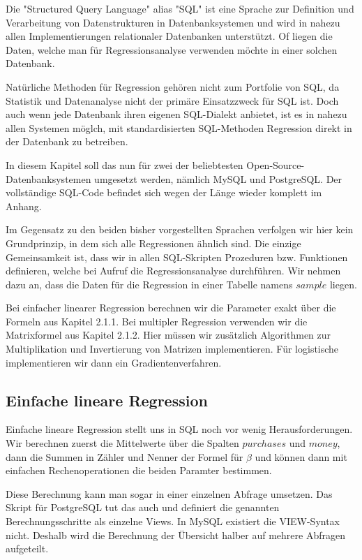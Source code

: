 Die "Structured Query Language" alias "SQL" ist eine Sprache zur Definition und Verarbeitung von Datenstrukturen in Datenbanksystemen und wird in nahezu allen Implementierungen relationaler Datenbanken unterstützt. Of liegen die Daten, welche man für Regressionsanalyse verwenden möchte in einer solchen Datenbank.

Natürliche Methoden für Regression gehören nicht zum Portfolie von SQL, da Statistik und Datenanalyse nicht der primäre Einsatzzweck für SQL ist. Doch auch wenn jede Datenbank ihren eigenen SQL-Dialekt anbietet, ist es in nahezu allen Systemen möglch, mit standardisierten SQL-Methoden Regression direkt in der Datenbank zu betreiben.

In diesem Kapitel soll das nun für zwei der beliebtesten Open-Source-Datenbanksystemen umgesetzt werden, nämlich MySQL und PostgreSQL. Der vollständige SQL-Code befindet sich wegen der Länge wieder komplett im Anhang.

Im Gegensatz zu den beiden bisher vorgestellten Sprachen verfolgen wir hier kein Grundprinzip, in dem sich alle Regressionen ähnlich sind. Die einzige Gemeinsamkeit ist, dass wir in allen SQL-Skripten Prozeduren bzw. Funktionen definieren, welche bei Aufruf die Regressionsanalyse durchführen. Wir nehmen dazu an, dass die Daten für die Regression in einer Tabelle namens $sample$ liegen.

Bei einfacher linearer Regression berechnen wir die Parameter exakt über die Formeln aus Kapitel 2.1.1. Bei multipler Regression verwenden wir die Matrixformel aus Kapitel 2.1.2. Hier müssen wir zusätzlich Algorithmen zur Multiplikation und Invertierung von Matrizen implementieren. Für logistische implementieren wir dann ein Gradientenverfahren.

\subsection{Einfache lineare Regression}

Einfache lineare Regression stellt uns in SQL noch vor wenig Herausforderungen. Wir berechnen zuerst die Mittelwerte über die Spalten $purchases$ und $money$, dann die Summen in Zähler und Nenner der Formel für $\beta$ und können dann mit einfachen Rechenoperationen die beiden Paramter bestimmen.

Diese Berechnung kann man sogar in einer einzelnen Abfrage umsetzen. Das Skript für PostgreSQL tut das auch und definiert die genannten Berechnungsschritte als einzelne Views. In MySQL existiert die VIEW-Syntax nicht. Deshalb wird die Berechnung der Übersicht halber auf mehrere Abfragen aufgeteilt.

